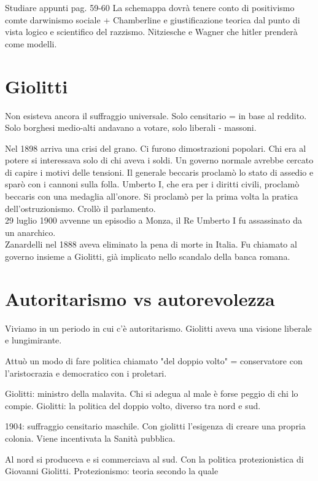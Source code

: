 \documentclass{article}
\begin{document}
    Studiare appunti pag. 59-60
    La schemappa dovrà tenere conto di positivismo comte darwinismo sociale + Chamberline e giustificazione teorica dal punto di vista logico e scientifico del razzismo. Nitziesche e Wagner che hitler prenderà come modelli.

    \section{Giolitti}

    Non esisteva ancora il suffraggio universale. Solo censitario = in base al reddito. Solo borghesi medio-alti andavano a votare, solo liberali - massoni.

    Nel 1898 arriva una crisi del grano. Ci furono dimostrazioni popolari. Chi era al potere si interessava solo di chi aveva i soldi. Un governo normale avrebbe cercato di capire i motivi delle tensioni. Il generale beccaris proclamò lo stato di assedio e sparò con i cannoni sulla folla. Umberto I, che era per i diritti civili, proclamò beccaris con una medaglia all'onore. Si proclamò per la prima volta la pratica dell'ostruzionismo. Crollò il parlamento.\\
    29 luglio 1900 avvenne un episodio a Monza, il Re Umberto I fu assassinato da un anarchico.\\
    Zanardelli nel 1888 aveva eliminato la pena di morte in Italia. Fu chiamato al governo insieme a Giolitti, già implicato nello scandalo della banca romana.


    \section{Autoritarismo vs autorevolezza}

    Viviamo in un periodo in cui c'è autoritarismo.
    Giolitti aveva una visione liberale e lungimirante.

    Attuò un modo di fare politica chiamato "del doppio volto" = conservatore con l'aristocrazia e democratico con i proletari.

    Giolitti: ministro della malavita. Chi si adegua al male è forse peggio di chi lo compie.
    Giolitti: la politica del doppio volto, diverso tra nord e sud.

    1904: suffraggio censitario maschile.
    Con giolitti l'esigenza di creare una propria colonia.
    Viene incentivata la Sanità pubblica.

    Al nord si produceva e si commerciava al sud. Con la politica protezionistica di Giovanni Giolitti.
    Protezionismo: teoria secondo la quale
\end{document}
